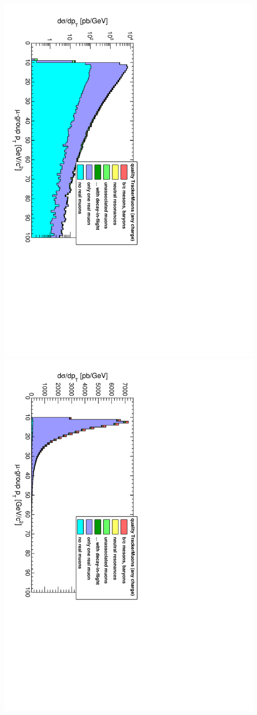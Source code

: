 \documentclass[compress]{beamer}
\begin{document}
\begin{frame}
{\includegraphics[height=0.5\linewidth, angle=90]{ptlog_PlainTrackerMuonAny.pdf}
\includegraphics[height=0.5\linewidth, angle=90]{ptlinear_PlainTrackerMuonAny.pdf}}

\end{frame}
\end{document}
